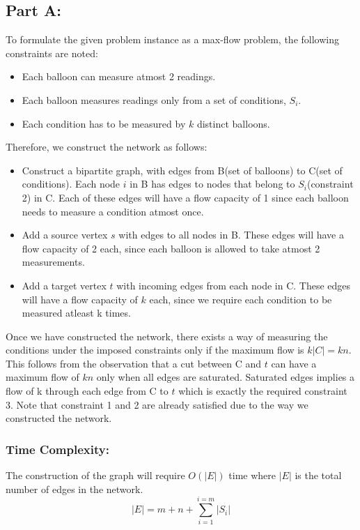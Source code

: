 \documentclass{article}
\begin{document}
\subsection{Part A:}
To formulate the given problem instance as a max-flow problem, the following constraints are noted:
\begin{itemize}
    \item Each balloon can measure atmost 2 readings.
    \item Each balloon measures readings only from a set of conditions, $S_i$.
    \item Each condition has to be measured by $k$ distinct balloons.
\end{itemize}
Therefore, we construct the network as follows:
\begin{itemize}
    \item Construct a bipartite graph, with edges from B(set of balloons) to C(set of conditions). Each node $i$ in B has edges to nodes that belong to $S_i$(constraint 2) in C.
    Each of these edges will have a flow capacity of 1 since each balloon needs to measure a condition atmost once.
    
    \item Add a source vertex $s$ with edges to all nodes in B. These edges will have a flow capacity of 2 each, since each balloon is allowed to take atmost 2 measurements.
    
    \item Add a target vertex $t$ with incoming edges from each node in C. These edges will have a flow capacity of $k$ each, since we require each condition to be measured atleast k times.
\end{itemize}

Once we have constructed the network, there exists a way of measuring the conditions under the imposed constraints only if the maximum flow is $k|C| = kn$. This follows  from the observation that a cut between C and $t$ can have a maximum flow of $kn$ only when all edges are saturated. Saturated edges implies a flow of k through each edge from C to $t$ which is exactly the required constraint 3. Note that constraint 1 and 2 are already satisfied due to the way we constructed the network.

\subsubsection{Time Complexity:}
The construction of the graph will require $O(|E|)$ time where $|E|$ is the total number of edges in the network.
$$|E| = m + n + \sum_{i=1}^{i=m}|S_i| $$
\end{document}
